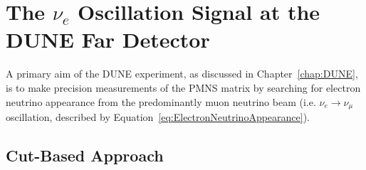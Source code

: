 
\chapter{The $\nu_e$ Oscillation Signal at the DUNE Far Detector}\label{chap:FDAnalysis}

A primary aim of the DUNE experiment, as discussed in Chapter~\ref{chap:DUNE}, is to make precision measurements of the PMNS matrix by searching for electron neutrino appearance from the predominantly muon neutrino beam (i.e. $\nu_e \rightarrow \nu_{\mu}$ oscillation, described by Equation~\ref{eq:ElectronNeutrinoAppearance}).

\section{Cut-Based Approach}

